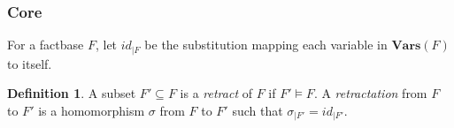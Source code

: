 \documentclass{article}
\theoremstyle{definition}
\newtheorem{definition}{Definition}[section]
\theoremstyle{remark}
\newcommand{\Vars}{\textbf{Vars}}
\newcommand{\Terms}{\textbf{Terms}}
\begin{document}




\subsubsection{Core}

For a factbase $F$, let $id_{|F}$ be the substitution mapping each variable in $\Vars(F)$ to itself.


\begin{definition}
A subset $F' \subseteq F$ is a \emph{retract} of $F$ if $F' \models F$. A \emph{retractation} from $F$ to $F'$ is a homomorphism $\sigma$ from $F$ to $F'$ such that $\sigma_{|F'}=id_{|F'}$.
\end{definition}
\end{document}
